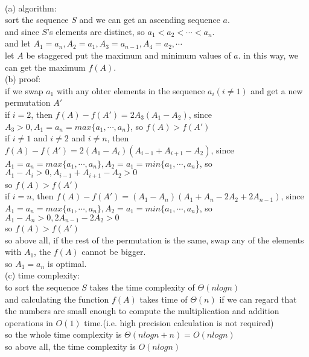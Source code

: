 \begin{solution}
\\
(a) algorithm:\\
sort the sequence $S$ and we can get an ascending sequence $a$.\\
and since $S$'s elements are distinct, so $a_1 < a_2 < \cdots < a_n$.\\
and let $A_1 = a_n , A_2 = a_1 , A_3 = a_{n-1} , A_4 = a_2 , \cdots$\\
let $A$ be staggered put the maximum and minimum values of $a$.
in this way, we can get the maximum $f(A)$.\\
(b) proof:\\
if we swap $a_1$ with any ohter elements in the sequence $a_i (i \neq 1)$ and get a new permutation $A'$\\
if $i=2$, then $f(A) - f(A') = 2A_3(A_1 - A_2)$,
since $A_3 > 0, A_1 = a_n = max\{a_1,\cdots,a_n\}$,
so $f(A)>f(A')$\\
if $i\neq 1$ and $i\neq 2$ and $i\neq n$, then $f(A) - f(A') = 2(A_1-A_i)(A_{i-1}+A_{i+1}-A_2)$,
since $A_1=a_n=max\{a_1,\cdots,a_n\},A_2=a_1=min\{a_1,\cdots,a_n\}$,
so $A_1-A_i > 0, A_{i-1}+A_{i+1}-A_2 > 0$\\
so $f(A) > f(A')$\\
if $i=n$, then $f(A)-f(A')=(A_1-A_n)(A_1+A_n-2A_2+2A_{n-1})$,
since $A_1=a_n=max\{a_1,\cdots,a_n\},A_2=a_1=min\{a_1,\cdots,a_n\}$,
so $A_1-A_n > 0, 2A_{n-1}-2A_2 > 0$\\
so $f(A) > f(A')$\\
so above all, if the rest of the permutation is the same, swap any of the elements with $A_1$, the $f(A)$ cannot be bigger.\\
so $A_1 = a_n$ is optimal.\\

(c) time complexity:\\
to sort the sequence $S$ takes the time complexity of $\Theta(nlogn)$\\
and calculating the function $f(A)$ takes time of $\Theta(n)$ if we can regard that the numbers are small enough to compute the multiplication and addition operations in $O(1)$ time.(i.e. high precision calculation is not required)\\
so the whole time complexity is $\Theta(nlogn + n) = O(nlogn)$\\
so above all, the time complexity is $O(nlogn)$
\end{solution}